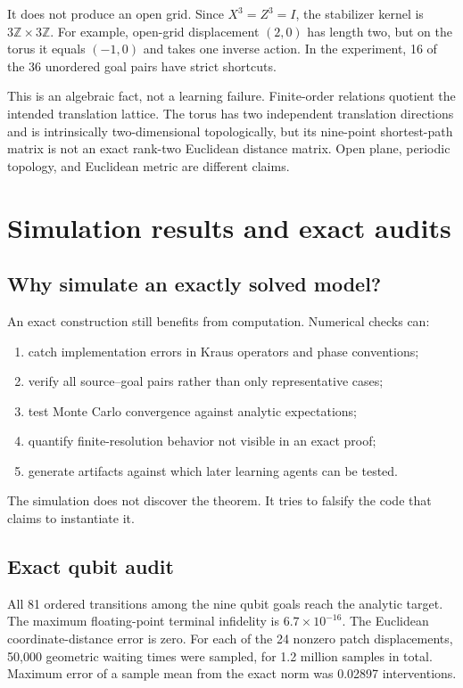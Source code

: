 \documentclass[11pt]{article}
\theoremstyle{definition}
\theoremstyle{remark}
\newcommand{\Z}{\mathbb Z}
\begin{document}
It does not produce an open grid. Since $X^3=Z^3=I$, the stabilizer kernel is
$3\Z\times3\Z$. For example, open-grid displacement $(2,0)$ has length two,
but on the torus it equals $(-1,0)$ and takes one inverse action. In the
experiment, 16 of the 36 unordered goal pairs have strict shortcuts.

This is an algebraic fact, not a learning failure. Finite-order relations
quotient the intended translation lattice. The torus has two independent
translation directions and is intrinsically two-dimensional topologically,
but its nine-point shortest-path matrix is not an exact rank-two Euclidean
distance matrix. Open plane, periodic topology, and Euclidean metric are
different claims.

\section{Simulation results and exact audits}
\label{sec:experiments}

\subsection{Why simulate an exactly solved model?}

An exact construction still benefits from computation. Numerical checks can:
\begin{enumerate}
  \item catch implementation errors in Kraus operators and phase conventions;
  \item verify all source--goal pairs rather than only representative cases;
  \item test Monte Carlo convergence against analytic expectations;
  \item quantify finite-resolution behavior not visible in an exact proof;
  \item generate artifacts against which later learning agents can be tested.
\end{enumerate}
The simulation does not discover the theorem. It tries to falsify the code
that claims to instantiate it.

\subsection{Exact qubit audit}

All 81 ordered transitions among the nine qubit goals reach the analytic
target. The maximum floating-point terminal infidelity is
$6.7\times10^{-16}$. The Euclidean coordinate-distance error is zero.
For each of the 24 nonzero patch displacements, 50,000 geometric waiting times
were sampled, for 1.2 million samples in total. Maximum error of a sample mean
from the exact norm was 0.02897 interventions.
\end{document}
